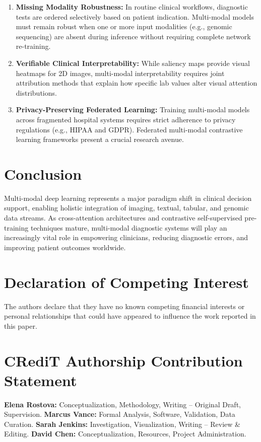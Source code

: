\documentclass[final,3p,times]{elsarticle}
\begin{document}
\begin{enumerate}
\item \textbf{Missing Modality Robustness:} In routine clinical workflows, diagnostic tests are ordered selectively based on patient indication. Multi-modal models must remain robust when one or more input modalities (e.g., genomic sequencing) are absent during inference without requiring complete network re-training.
\item \textbf{Verifiable Clinical Interpretability:} While saliency maps provide visual heatmaps for 2D images, multi-modal interpretability requires joint attribution methods that explain how specific lab values alter visual attention distributions.
\item \textbf{Privacy-Preserving Federated Learning:} Training multi-modal models across fragmented hospital systems requires strict adherence to privacy regulations (e.g., HIPAA and GDPR). Federated multi-modal contrastive learning frameworks present a crucial research avenue.
\end{enumerate}

\section{Conclusion}
\label{sec:conclusion}
Multi-modal deep learning represents a major paradigm shift in clinical decision support, enabling holistic integration of imaging, textual, tabular, and genomic data streams. As cross-attention architectures and contrastive self-supervised pre-training techniques mature, multi-modal diagnostic systems will play an increasingly vital role in empowering clinicians, reducing diagnostic errors, and improving patient outcomes worldwide.

\section*{Declaration of Competing Interest}
The authors declare that they have no known competing financial interests or personal relationships that could have appeared to influence the work reported in this paper.

\section*{CRediT Authorship Contribution Statement}
\textbf{Elena Rostova:} Conceptualization, Methodology, Writing – Original Draft, Supervision. \textbf{Marcus Vance:} Formal Analysis, Software, Validation, Data Curation. \textbf{Sarah Jenkins:} Investigation, Visualization, Writing – Review \& Editing. \textbf{David Chen:} Conceptualization, Resources, Project Administration.
\end{document}
